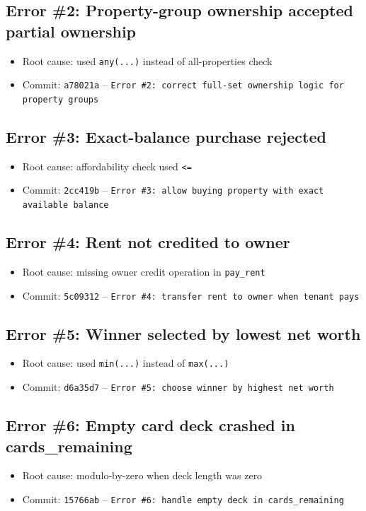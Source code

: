 \documentclass[11pt,a4paper]{article}
\begin{document}
\subsection*{Error \#2: Property-group ownership accepted partial ownership}
\begin{itemize}
  \item Root cause: used \texttt{any(...)} instead of all-properties check
  \item Commit: \texttt{a78021a} -- \texttt{Error \#2: correct full-set ownership logic for property groups}
\end{itemize}

\subsection*{Error \#3: Exact-balance purchase rejected}
\begin{itemize}
  \item Root cause: affordability check used \texttt{<=}
  \item Commit: \texttt{2cc419b} -- \texttt{Error \#3: allow buying property with exact available balance}
\end{itemize}

\subsection*{Error \#4: Rent not credited to owner}
\begin{itemize}
  \item Root cause: missing owner credit operation in \texttt{pay\_rent}
  \item Commit: \texttt{5c09312} -- \texttt{Error \#4: transfer rent to owner when tenant pays}
\end{itemize}

\subsection*{Error \#5: Winner selected by lowest net worth}
\begin{itemize}
  \item Root cause: used \texttt{min(...)} instead of \texttt{max(...)}
  \item Commit: \texttt{d6a35d7} -- \texttt{Error \#5: choose winner by highest net worth}
\end{itemize}

\subsection*{Error \#6: Empty card deck crashed in cards\_remaining}
\begin{itemize}
  \item Root cause: modulo-by-zero when deck length was zero
  \item Commit: \texttt{15766ab} -- \texttt{Error \#6: handle empty deck in cards\_remaining}
\end{itemize}
\end{document}
